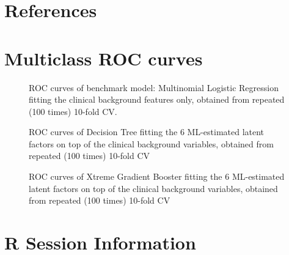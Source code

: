 \documentclass{amsart}
\begin{document}


\newpage
\section*{References}
\printbibliography[heading=none]
\clearpage
\appendix 
\clearpage
\section{Multiclass ROC curves} \label{appendixA}
\begin{figure}[htb]
  
  \caption{ROC curves of benchmark model: Multinomial Logistic Regression fitting the clinical background features only, obtained from repeated (100 times) 10-fold CV.}
  \label{roc:bench}
\end{figure}
\begin{figure}[htb]

\caption{ROC curves of Decision Tree fitting the 6 ML-estimated latent factors on top of the clinical background variables, obtained from repeated (100 times) 10-fold CV}
\label{roc:tree}
\end{figure}
\begin{figure}

\caption{ROC curves of Xtreme Gradient Booster fitting the 6 ML-estimated latent factors on top of the clinical background variables, obtained from repeated (100 times) 10-fold CV}
\label{roc:xgb}
\end{figure}

\clearpage
\section{R Session Information} \label{appendixB}
\end{document}
